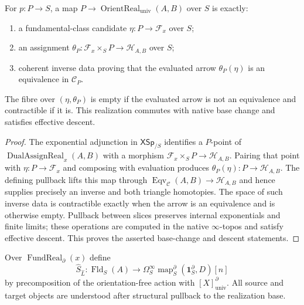 \begin{proposition}
\label{prop:prequantum-orientation-realization-universal-property}
For $p:P\to S$, a map
$P\to\operatorname{OrientReal}_{\mathrm{univ}}(A,B)$ over $S$ is exactly:
\begin{enumerate}
\item a fundamental-class candidate $\eta:P\to\mathcal F_x$ over $S$;
\item an assignment
      $\theta_P:\mathcal F_x\times_SP\to\mathcal H_{A,B}$ over $S$;
\item coherent inverse data proving that the evaluated arrow
      $\theta_P(\eta)$ is an equivalence in $\mathcal C_P$.
\end{enumerate}
The fibre over $(\eta,\theta_P)$ is empty if the evaluated arrow is not an
equivalence and contractible if it is.  This realization commutes with native
base change and satisfies effective descent.
\end{proposition}

\begin{proof}
The exponential adjunction in $\mathsf{XSp}_{/S}$ identifies a $P$-point of
$\operatorname{DualAssignReal}_x(A,B)$ with a morphism
$\mathcal F_x\times_SP\to\mathcal H_{A,B}$.  Pairing that point with
$\eta:P\to\mathcal F_x$ and composing with evaluation produces
$\theta_P(\eta):P\to\mathcal H_{A,B}$.  The defining pullback lifts this map
through
$\operatorname{Eqv}_{\mathcal C}(A,B)\to\mathcal H_{A,B}$ and hence supplies
precisely an inverse and both triangle homotopies.  The space of such inverse
data is contractible exactly when the arrow is an equivalence and is otherwise
empty.  Pullback between slices preserves internal exponentials and finite
limits; these operations are computed in the native $\infty$-topos and satisfy
effective descent.  This proves the asserted base-change and descent
statements.
\end{proof}

\begin{construction}
\label{constr:prequantum-scalarized-action}
Over $\operatorname{FundReal}_{\partial}(x)$ define
\[
\boxed{
\widehat S_{\widehat L}:
\operatorname{Fld}_S(A)
\longrightarrow
\Omega_S^\infty
\operatorname{map}^{\partial}_S
(\mathbf1_S^{\partial},D)[n]
}
\]
by precomposition of the orientation-free action with
$[X]^\partial_{\mathrm{univ}}$.  All source and target objects are understood after
structural pullback to the realization base.
\end{construction}

